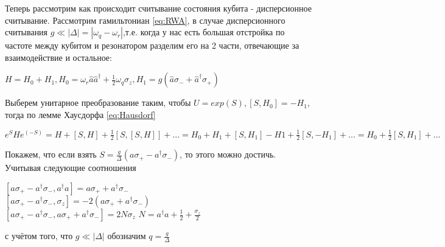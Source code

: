 \documentclass[12pt, a4paper, openany]{book}
\begin{document}
Теперь рассмотрим как происходит считывание состояния кубита - дисперсионное считывание. Рассмотрим гамильтониан \ref{eq:RWA}, в случае дисперсионного считывания $g\ll |\Delta|=|\omega_q-\omega_r|$,т.е. когда у нас есть большая отстройка по частоте между кубитом
и резонатором разделим его на 2 части, отвечающие за взаимодействие и остальное:
\begin{center}
$H=H_0+H_1,
H_0=\omega_r\hat{a}\hat{a}^{\dagger}+\frac{1}{2}\omega_q\sigma_z,
H_1=g(\hat{a}\sigma_-+\hat{a}^{\dagger}\sigma_+)
$
\end{center} 
Выберем унитарное преобразование таким\cite{Gu2017}, чтобы $U=exp(S),
[S,H_0]=-H_1$, тогда по лемме Хаусдорфа \ref{eq:Hausdorf}
\begin{center}
$e^SHe^(-S) = H+ [S,H]+\frac{1}{2}[S,[S,H]]+...=
H_0+H_1+[S,H_1]-H1+\frac{1}{2}[S,-H_1]+...=
H_0+\frac{1}{2}[S,H_1]+...$
\end{center}
Покажем, что если взять $S=\frac{g}{\Delta}(a\sigma_+-a^{\dagger}\sigma_-)$, то этого можно достичь.
Учитывая следующие соотношения
\begin{center}
$
[a\sigma_+-a^{\dagger}\sigma_-,a^{\dagger}a]=
a\sigma_++a^{\dagger}\sigma_-$\\
$
[a\sigma_+-a^{\dagger}\sigma_-,\sigma_z]=
-2(a\sigma_++a^{\dagger}\sigma_-)$\\
$
[a\sigma_+-a^{\dagger}\sigma_-,a\sigma_++
a^{\dagger}\sigma_-]=2N\sigma_z
$
$
N=a^{\dagger}a+\frac{1}{2}+\frac{\sigma_z}{2}
$ 
\end{center}
с учётом того, что $g \ll |\Delta|$ обозначим  $q=\frac{g}{\Delta}$ 
\end{document}
